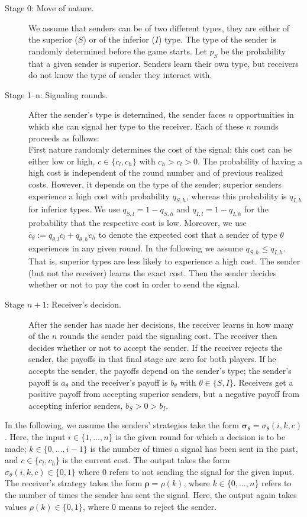 \documentclass[11pt]{article}
\theoremstyle{plainCl1}
\begin{document}
\begin{description}
\item[Stage 0: Move of nature.] We assume that senders can be of two different types, they are either of the superior ($S$) or of the inferior ($I$) type. The type of the sender is randomly determined before the game starts. Let $p_S$ be the probability that a given sender is superior. Senders learn their own type, but receivers do not know the type of sender they interact with. 
\item[Stage 1--n: Signaling rounds.] After the sender's type is determined, the sender faces $n$ opportunities in which she can signal her type to the receiver. Each of these $n$ rounds proceeds as follows:\\
First nature randomly determines the cost of the signal; this cost can be either low or high, $c\!\in\!\{c_l,c_h\}$ with $c_h\!>\!c_l\!>\!0$. The probability of having a high cost is independent of the round number and of previous realized costs. However, it depends on the type of the sender; superior senders experience a high cost with probability $q_{S,h}$, whereas this probability is $q_{I,h}$ for inferior types. We use $q_{S,l}=1-q_{S,h}$ and $q_{I,l}=1-q_{I,h}$ for the probability that the respective cost is low. 
Moreover, we use $\bar{c}_\theta:=q_{\theta,l} c_l + q_{\theta,h} c_h$ to denote the expected cost that a sender of type $\theta$ experiences in any given round. 
In the following we assume $q_{S,h}\!\le\!q_{I,h}$. 
That is, superior types are less likely to experience a high cost. The sender (but not the receiver) learns the exact cost. Then the sender decides whether or not to pay the cost in order to send the signal. 
\item[Stage $n+1$: Receiver's decision.] After the sender has made her decisions, the receiver learns in how many of the $n$ rounds the sender paid the signaling cost. The receiver then decides whether or not to accept the sender. If the receiver rejects the sender, the payoffs in that final stage are zero for both players. If he accepts the sender, the payoffs depend on the sender's type; the sender's payoff is $a_\theta$ and the receiver's payoff is $b_\theta$ with $\theta\in\{S,I\}$. 
Receivers get a positive payoff from accepting superior senders, but a negative payoff from accepting inferior senders, $b_S > 0 > b_I$. 
\end{description}

\noindent
In the following, we assume the senders' strategies take the form $\mathbf{\sigma}_\theta = \sigma_\theta(i,k,c)$. 
Here, the input $i\in\{1,\ldots,n\}$ is the given round for which a decision is to be made; $k\in\{0,\ldots,i-1\}$ is the number of times a signal has been sent in the past, and $c\in\{c_l, c_h\}$ is the current cost. The output takes the form $\sigma_\theta(i,k,c) \in \{0,1\}$ where 0 refers to not sending the signal for the given input. 
The receiver's strategy takes the form $\mathbf{\rho} = \rho(k)$, where $k\in\{0,\ldots,n\}$ refers to the number of times the sender has sent the signal. Here, the output again takes values  $\rho(k)\in\{0,1\}$, where $0$ means to reject the sender. 
\end{document}
